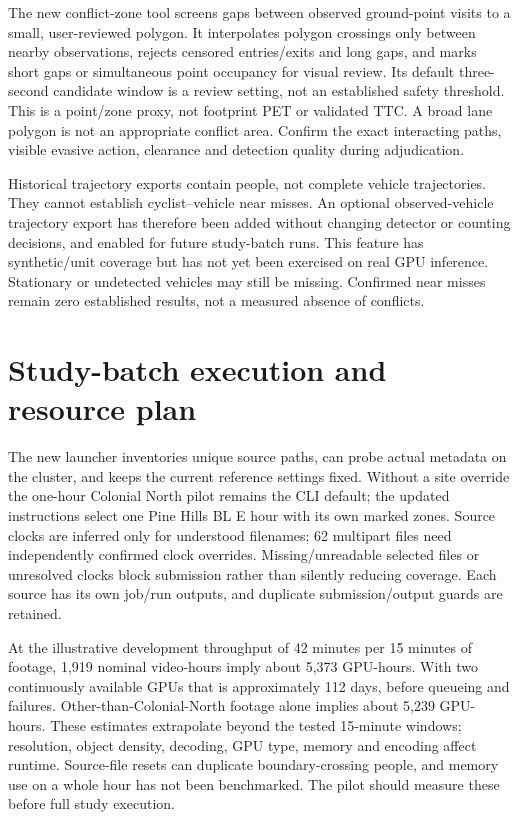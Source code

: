 \documentclass[11pt,letterpaper]{article}
\begin{document}
The new conflict-zone tool screens gaps between observed ground-point visits to a small, user-reviewed polygon. It interpolates polygon crossings only between nearby observations, rejects censored entries/exits and long gaps, and marks short gaps or simultaneous point occupancy for visual review. Its default three-second candidate window is a review setting, not an established safety threshold. This is a point/zone proxy, not footprint PET or validated TTC. A broad lane polygon is not an appropriate conflict area. Confirm the exact interacting paths, visible evasive action, clearance and detection quality during adjudication.

Historical trajectory exports contain people, not complete vehicle trajectories. They cannot establish cyclist--vehicle near misses. An optional observed-vehicle trajectory export has therefore been added without changing detector or counting decisions, and enabled for future study-batch runs. This feature has synthetic/unit coverage but has not yet been exercised on real GPU inference. Stationary or undetected vehicles may still be missing. Confirmed near misses remain zero established results, not a measured absence of conflicts.

\section{Study-batch execution and resource plan}
The new launcher inventories unique source paths, can probe actual metadata on the cluster, and keeps the current reference settings fixed. Without a site override the one-hour Colonial North pilot remains the CLI default; the updated instructions select one Pine Hills BL E hour with its own marked zones. Source clocks are inferred only for understood filenames; 62 multipart files need independently confirmed clock overrides. Missing/unreadable selected files or unresolved clocks block submission rather than silently reducing coverage. Each source has its own job/run outputs, and duplicate submission/output guards are retained.

At the illustrative development throughput of 42 minutes per 15 minutes of footage, 1,919 nominal video-hours imply about 5,373 GPU-hours. With two continuously available GPUs that is approximately 112 days, before queueing and failures. Other-than-Colonial-North footage alone implies about 5,239 GPU-hours. These estimates extrapolate beyond the tested 15-minute windows; resolution, object density, decoding, GPU type, memory and encoding affect runtime. Source-file resets can duplicate boundary-crossing people, and memory use on a whole hour has not been benchmarked. The pilot should measure these before full study execution.
\end{document}
